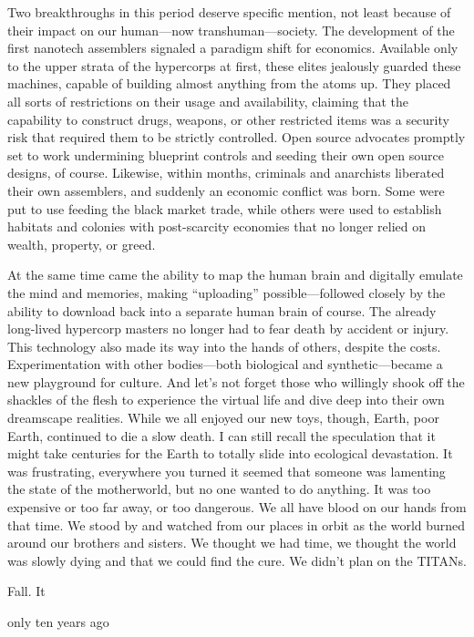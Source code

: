 Two breakthroughs in this period deserve specific
mention, not least because of their impact on our
human—now transhuman—society. The development 
of the first nanotech assemblers signaled a paradigm 
shift for economics. Available only to the upper 
strata of the hypercorps at first, these elites jealously 
guarded these machines, capable of building almost 
anything from the atoms up. They placed all sorts of 
restrictions on their usage and availability, claiming 
that the capability to construct drugs, weapons, or 
other restricted items was a security risk that required 
them to be strictly controlled. Open source advocates 
promptly set to work undermining blueprint controls 
and seeding their own open source designs, of course. 
Likewise, within months, criminals and anarchists 
liberated their own assemblers, and suddenly an economic
conflict was born. Some were put to use feeding
the black market trade, while others were used
to establish habitats and colonies with post-scarcity 
economies that no longer relied on wealth, property, 
or greed.

At the same time came the ability to map the 
human brain and digitally emulate the mind and 
memories, making ``uploading'' possible—followed 
closely by the ability to download back into a separate
human brain of course. The already long-lived
hypercorp masters no longer had to fear death by 
accident or injury. This technology also made its way 
into the hands of others, despite the costs. Experimentation
with other bodies—both biological and
synthetic—became a new playground for culture. 
And let's not forget those who willingly shook off the 
shackles of the flesh to experience the virtual life and 
dive deep into their own dreamscape realities.
While we all enjoyed our new toys, though, Earth, 
poor Earth, continued to die a slow death. I can still 
recall the speculation that it might take centuries for 
the Earth to totally slide into ecological devastation. It 
was frustrating, everywhere you turned it seemed that 
someone was lamenting the state of the motherworld, 
but no one wanted to do anything. It was too expensive
or too far away, or too dangerous. We all have
blood on our hands from that time. We stood by and 
watched from our places in orbit as the world burned 
around our brothers and sisters. We thought we had 
time, we thought the world was slowly dying and that 
we could find the cure. We didn't plan on the TITANs.

Fall. It

 only ten years 
ago

